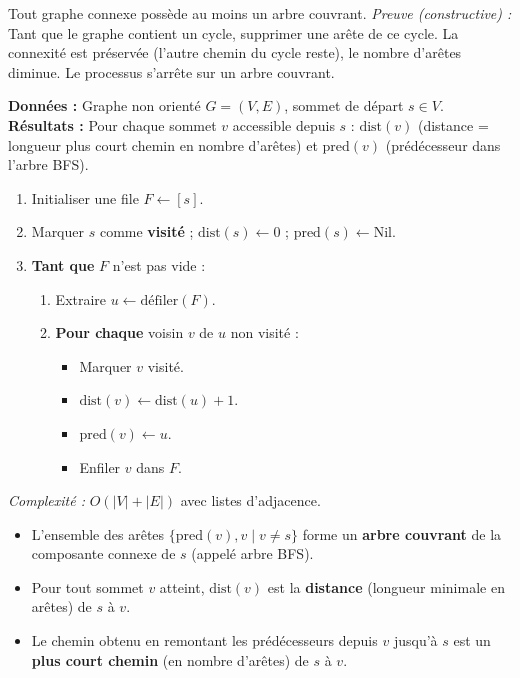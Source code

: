 \documentclass[11pt]{article}
\newcommand{\cle}[1]{{\popxbold\color{popdark}#1}}
\newcounter{popsec}
\newcounter{popsub}
\newcommand{\courssub}[1]{%
  \stepcounter{popsub}%
  \par\vspace{9pt}\noindent{\popxbold\fontsize{11.5}{13}\selectfont\color{popink}{\color{poporange}\thepopsec.\thepopsub}\hspace{6pt}#1}\par\nopagebreak\vspace{4pt}
}
\begin{document}
\begin{propriete}
Tout graphe connexe possède au moins un arbre couvrant.
\emph{Preuve (constructive) :} Tant que le graphe contient un cycle, supprimer une arête de ce cycle. La connexité est préservée (l'autre chemin du cycle reste), le nombre d'arêtes diminue. Le processus s'arrête sur un arbre couvrant.
\end{propriete}

\courssub{Parcours en largeur (BFS)}

\begin{methode}
\textbf{Données :} Graphe non orienté $G=(V,E)$, sommet de départ $s \in V$.
\textbf{Résultats :} Pour chaque sommet $v$ accessible depuis $s$ : $\text{dist}(v)$ (distance = longueur plus court chemin en nombre d'arêtes) et $\text{pred}(v)$ (prédécesseur dans l'arbre BFS).
\begin{enumerate}
    \item Initialiser une file $F \leftarrow [s]$.
    \item Marquer $s$ comme \textbf{visité} ; $\text{dist}(s) \leftarrow 0$ ; $\text{pred}(s) \leftarrow \text{Nil}$.
    \item \textbf{Tant que} $F$ n'est pas vide :
    \begin{enumerate}
        \item Extraire $u \leftarrow \text{défiler}(F)$.
        \item \textbf{Pour chaque} voisin $v$ de $u$ non visité :
        \begin{itemize}
            \item Marquer $v$ visité.
            \item $\text{dist}(v) \leftarrow \text{dist}(u) + 1$.
            \item $\text{pred}(v) \leftarrow u$.
            \item Enfiler $v$ dans $F$.
        \end{itemize}
    \end{enumerate}
\end{enumerate}
\emph{Complexité :} $O(|V| + |E|)$ avec listes d'adjacence.
\end{methode}

\begin{propriete}
\begin{itemize}
    \item L'ensemble des arêtes $\{\text{pred}(v), v \mid v \neq s\}$ forme un \textbf{arbre couvrant} de la composante connexe de $s$ (appelé \cle{arbre BFS}).
    \item Pour tout sommet $v$ atteint, $\text{dist}(v)$ est la \textbf{distance} (longueur minimale en arêtes) de $s$ à $v$.
    \item Le chemin obtenu en remontant les prédécesseurs depuis $v$ jusqu'à $s$ est un \textbf{plus court chemin} (en nombre d'arêtes) de $s$ à $v$.
\end{itemize}
\end{propriete}
\end{document}
